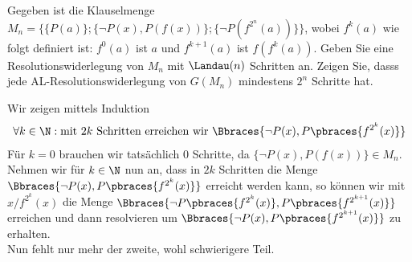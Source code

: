 
\begin{exercise}[186]

Gegeben ist die Klauselmenge $M_n = \{\{P(a)\};\{\neg P(x),P(f(x))\};\{\neg P(f^{2^n}(a))\}\}$,
wobei $f^k(a)$ wie folgt definiert ist: $f^0(a)$ ist $a$ und $f^{k+1}(a)$ ist $f(f^k(a))$.
Geben Sie eine Resolutionswiderlegung von $M_n$ mit $\Landau(n)$ Schritten an.
Zeigen Sie, dasss jede AL-Resolutionswiderlegung von $G(M_n)$ mindestens $2^n$
Schritte hat.

\end{exercise}


\begin{solution}

	Wir zeigen mittels Induktion
	\begin{align*}
	\forall k \in \N: \text{mit } 2k \text{ Schritten erreichen wir } \Bbraces{\neg P(x), P\pbraces{f^{2^k}(x)}}
	\end{align*}
	Für $k = 0$ brauchen wir tatsächlich $0$ Schritte, da $\{\neg P(x),P(f(x))\} \in M_n$. Nehmen wir für $k \in \N$ nun an, dass in $2k$ Schritten die Menge $\Bbraces{\neg P(x), P\pbraces{f^{2^k}(x)}}$ erreicht werden kann, so können wir mit $x / f^{2^k}(x)$ die Menge $\Bbraces{\neg P\pbraces{f^{2^k}(x)}, P\pbraces{f^{2^{k + 1}}(x)}}$ erreichen und dann resolvieren um $\Bbraces{\neg P(x), P\pbraces{f^{2^{k + 1}}(x)}}$ zu erhalten. \\
	Nun fehlt nur mehr der zweite, wohl schwierigere Teil.
\end{solution}

